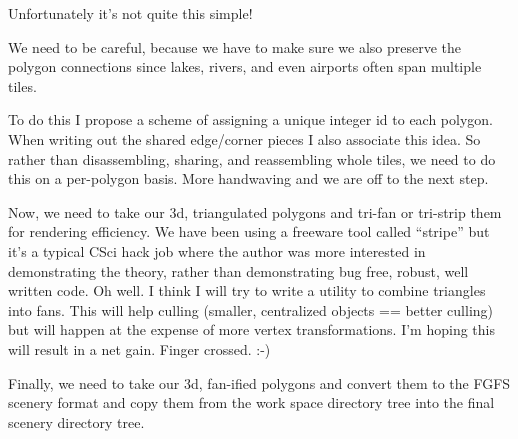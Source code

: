 \documentclass[12pt]{article}
\begin{document}
Unfortunately it's not quite this simple!

We need to be careful, because we have to make sure we also preserve
the polygon connections since lakes, rivers, and even airports often
span multiple tiles.

To do this I propose a scheme of assigning a unique integer id to each
polygon.  When writing out the shared edge/corner pieces I also
associate this idea.  So rather than disassembling, sharing, and
reassembling whole tiles, we need to do this on a per-polygon basis.
More handwaving and we are off to the next step.

Now, we need to take our 3d, triangulated polygons and tri-fan or
tri-strip them for rendering efficiency.  We have been using a
freeware tool called ``stripe'' but it's a typical CSci hack job where
the author was more interested in demonstrating the theory, rather
than demonstrating bug free, robust, well written code.  Oh well.  I
think I will try to write a utility to combine triangles into fans.
This will help culling (smaller, centralized objects == better
culling) but will happen at the expense of more vertex
transformations.  I'm hoping this will result in a net gain.  Finger
crossed. :-)

Finally, we need to take our 3d, fan-ified polygons and convert them
to the FGFS scenery format and copy them from the work space directory
tree into the final scenery directory tree.

\end{document}
